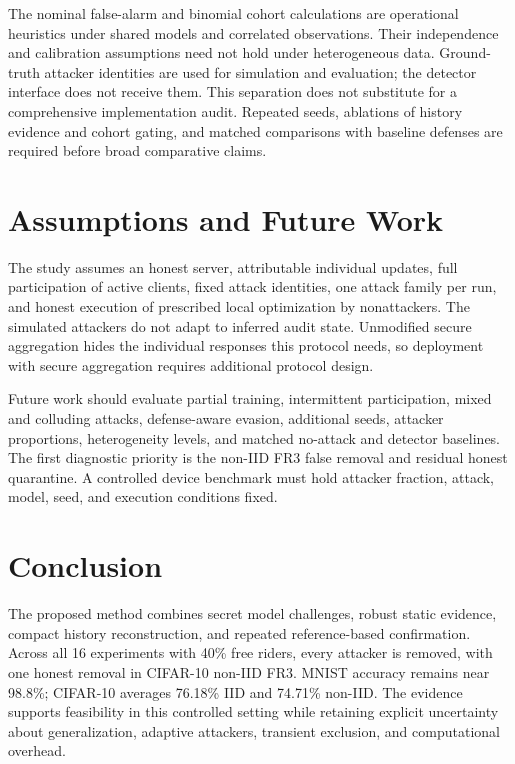 \documentclass[conference]{IEEEtran}
\begin{document}
The nominal false-alarm and binomial cohort calculations are operational heuristics under shared models and correlated observations. Their independence and calibration assumptions need not hold under heterogeneous data. Ground-truth attacker identities are used for simulation and evaluation; the detector interface does not receive them. This separation does not substitute for a comprehensive implementation audit. Repeated seeds, ablations of history evidence and cohort gating, and matched comparisons with baseline defenses are required before broad comparative claims.

\section{Assumptions and Future Work}
The study assumes an honest server, attributable individual updates, full participation of active clients, fixed attack identities, one attack family per run, and honest execution of prescribed local optimization by nonattackers. The simulated attackers do not adapt to inferred audit state. Unmodified secure aggregation hides the individual responses this protocol needs, so deployment with secure aggregation requires additional protocol design.

Future work should evaluate partial training, intermittent participation, mixed and colluding attacks, defense-aware evasion, additional seeds, attacker proportions, heterogeneity levels, and matched no-attack and detector baselines. The first diagnostic priority is the non-IID FR3 false removal and residual honest quarantine. A controlled device benchmark must hold attacker fraction, attack, model, seed, and execution conditions fixed.

\section{Conclusion}
The proposed method combines secret model challenges, robust static evidence, compact history reconstruction, and repeated reference-based confirmation. Across all 16 experiments with 40\% free riders, every attacker is removed, with one honest removal in CIFAR-10 non-IID FR3. MNIST accuracy remains near 98.8\%; CIFAR-10 averages 76.18\% IID and 74.71\% non-IID. The evidence supports feasibility in this controlled setting while retaining explicit uncertainty about generalization, adaptive attackers, transient exclusion, and computational overhead.
\FloatBarrier
\balance


\end{document}
